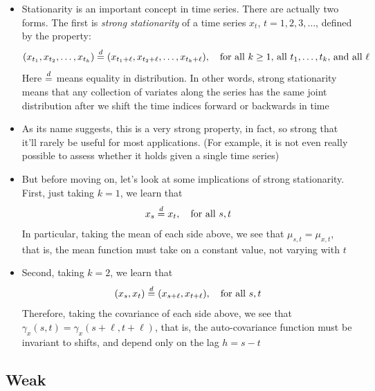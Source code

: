 \documentclass{article}
\begin{document}
\begin{itemize}
\item Stationarity is an important concept in time series. There are actually
  two forms. The first is \emph{strong stationarity} of a time series $x_t$,
  $t = 1,2,3,\dots$, defined by the property:
  \[
  (x_{t_1}, x_{t_2}, \dots, x_{t_k}) \overset{d}{=} (x_{t_1+\ell}, x_{t_2+\ell}, \dots,
  x_{t_k+\ell}), \quad \text{for all $k \geq 1$, all $t_1,\dots,t_k$, and all
    $\ell$}   
  \]
  Here $\overset{d}{=}$ means equality in distribution. In other words, strong
  stationarity means that any collection of variates along the series has the
  same joint distribution after we shift the time indices forward or backwards
  in time  

\item As its name suggests, this is a very strong property, in fact, so strong 
  that it'll rarely be useful for most applications. (For example, it is not
  even really possible to assess whether it holds given a single time series)  

\item But before moving on, let's look at some implications of strong 
  stationarity. First, just taking $k=1$, we learn that
  \[
  x_s \overset{d}{=} x_t, \quad \text{for all $s,t$}
  \]
  In particular, taking the mean of each side above, we see that $\mu_{s,t} =
  \mu_{x,t}$, that is, the mean function must take on a constant value, not
  varying with $t$

\item Second, taking $k=2$, we learn that 
  \[
  (x_s, x_t) \overset{d}{=} (x_{s+\ell}, x_{t+\ell}), \quad \text{for all $s,t$} 
  \]
  Therefore, taking the covariance of each side above, we see that
  $\gamma_x(s,t) = \gamma_x(s+\ell, t+\ell)$, that is, the auto-covariance
  function must be invariant to shifts, and depend only on the lag $h = s-t$  
\end{itemize}

\subsection{Weak}
\end{document}
